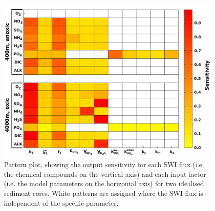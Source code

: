 \documentclass[gmd, manuscript]{copernicus}
\begin{document}
\begin{figure}[htbp]
\begin{center}
	\includegraphics[width=1.0\textwidth]{figures/SA/0_KSIndex_ALL_OUTPUT_13042017.pdf}
	\caption{Pattern plot, showing the output sensitivity for each SWI flux (i.e. the chemical compounds on the vertical axis) and each input factor (i.e. the model parameters 
	on the horizontal axis) for two idealised sediment cores. White patterns are assigned where the SWI flux is independent of the specific parameter. 
	}
	\label{fig:Sensitivity_Analysis}
	\end{center}
\end{figure}
\end{document}

